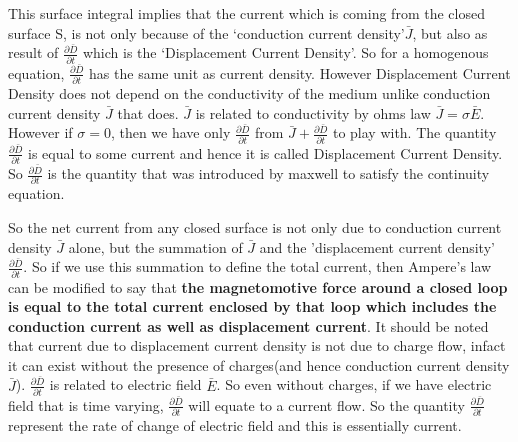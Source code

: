 This surface integral implies that the current which is coming from the closed surface S, is not only because of the \textquoteleft conduction current density\textquoteright $\bar{J}$, but also as  result of $\frac{\partial\bar{D}}{\partial t}$ which is the \textquoteleft Displacement Current Density\textquoteright. So for a homogenous equation, $\frac{\partial\bar{D}}{\partial t}$ has the same unit as current density. However Displacement Current Density does not depend on the conductivity of the medium unlike conduction current density $\bar{J}$ that does. $\bar{J}$ is related to conductivity by ohms law $\bar{J}=\sigma\bar{E}$. However if $\sigma=0$, then we have only $\frac{\partial\bar{D}}{\partial t}$ from $\bar{J}+\frac{\partial\bar{D}}{\partial t}$ to play with. The quantity $\frac{\partial\bar{D}}{\partial t}$ is equal to some current and hence it is called Displacement Current Density. So $\frac{\partial\bar{D}}{\partial t}$ is the quantity that was introduced by maxwell to satisfy the continuity equation.

So the net current from any closed surface is not only due to conduction current density $\bar{J}$ alone, but the summation of $\bar{J}$ and the 'displacement current density' $\frac{\partial\bar{D}}{\partial t}$. So if we use this summation to define the total current, then Ampere's law can be modified to say that \textbf{the magnetomotive force around a closed loop is equal to the total current enclosed by that loop which includes the conduction current as well as displacement current}. It should be noted that current due to displacement current density is not due to charge flow, infact it can exist without the presence of charges(and hence conduction current density $\bar{J}$). $\frac{\partial\bar{D}}{\partial t}$ is related to electric field $\bar{E}$. So even without charges, if we have electric field that is time varying, $\frac{\partial\bar{D}}{\partial t}$ will equate to a current flow. So the quantity $\frac{\partial\bar{D}}{\partial t}$ represent the rate of change of electric field and this is essentially current.


